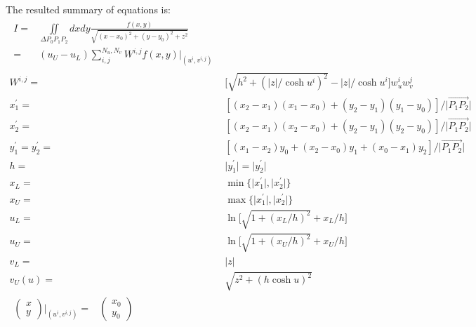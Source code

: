 \documentclass [10pt,letterpaper]{article}
\begin{document}
The resulted summary of equations is:
\begin{subequations} \label{eq:radial-angular-method-summary-of-equations}
	\begin{align}
		\begin{split} 
			I
			=&
			\iint \limits_{\Delta P_0 P_1 P_2}
			dx dy
			\frac{ f(x,y) } { \sqrt{ (x-x_0)^2 + (y-y_0)^2 + z^2 } }
			\\
			=&
			(u_U-u_L)
			\sum \nolimits_{i,j}^{N_u,N_v} 
			W^{i,j}
			f(x,y)
			\big\vert
			_{ (u^i,v^{i,j}) }
		\end{split}
		\\
		W^{i,j}
		=& 
			\big [
				\sqrt{ h^2 + (
					{ \lvert z \rvert } / { \cosh{u^i} } )^2 }
				- { \lvert z \rvert } / { \cosh{u^i} }
			\big ]
			w_u^i w_v^j
		\\
		x_1^{\prime}	
		=&	
		[
			(x_2-x_1)(x_1-x_0)
			+ 
			(y_2-y_1)(y_1-y_0)
		]
		/{\lvert \overrightarrow{P_1 P_2} \rvert}
		\\ 
		x_2^{\prime}	
		=&	
		[
			(x_2-x_1)(x_2-x_0)
			+ 
			(y_2-y_1)(y_2-y_0)
		]
		/{\lvert \overrightarrow{P_1 P_2} \rvert}
		\\
		y_1^{\prime}
		=y_2^{\prime}
		=& 
		[
			(x_1-x_2)y_0
			+
			(x_2-x_0)y_1
			+
			(x_0-x_1)y_2 
		]
		/{\lvert \overrightarrow{P_1 P_2} \rvert}
		\\
		h
		=&
		\lvert y_1^{\prime} \rvert
		=
		\lvert y_2^{\prime} \rvert
		\\
		x_L
		=&
		\min
		\{
			\lvert x_1^{\prime} \rvert,
			\lvert x_2^{\prime} \rvert
		\}
		\\
		x_U
		=&
		\max
		\{
			\lvert x_1^{\prime} \rvert,
			\lvert x_2^{\prime} \rvert
		\}
		\\
		u_L	=&
			\ln\big[
				\sqrt{1+({x_L}/{h})^2}
				+ {x_L}/{h}
			\big]
		\\
		u_U	=&
			\ln\big[
				\sqrt{1+({x_U}/{h})^2}
				+ {x_U}/{h}
			\big]
		\\
		v_L	=&	\lvert z \rvert				\\
		v_U(u)	=&	\sqrt{ z^2 + (h \cosh{u})^2 }		\\ 
		\begin{split} 
			\begin{pmatrix} 
				x					\\
				y
			\end{pmatrix}
			\bigg\vert _{ (u^i,v^{i,j}) }
			=& 
			\begin{pmatrix}
				x_0					\\
				y_0
			\end{pmatrix}

\end{split}
\end{align}
\end{subequations}
\end{document}
